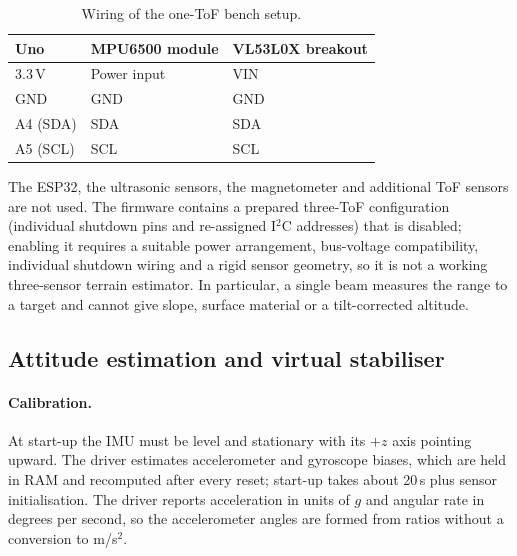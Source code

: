 \documentclass[11pt,a4paper]{article}
\begin{document}
\begin{table}[ht]
\centering
\small
\begin{tabular}{@{}l l l@{}}
\toprule
\textbf{Uno} & \textbf{MPU6500 module} & \textbf{VL53L0X breakout}\\
\midrule
3.3\,V & Power input & VIN\\
GND & GND & GND\\
A4 (SDA) & SDA & SDA\\
A5 (SCL) & SCL & SCL\\
\bottomrule
\end{tabular}
\caption{Wiring of the one-ToF bench setup.}
\label{tab:wiring}
\end{table}
 

\noindent
The ESP32, the ultrasonic sensors, the magnetometer and additional ToF sensors are not used. The firmware contains a prepared three-ToF configuration (individual shutdown pins and re-assigned I$^2$C addresses) that is disabled; enabling it requires a suitable power arrangement, bus-voltage compatibility, individual shutdown wiring and a rigid sensor geometry, so it is not a working three-sensor terrain estimator. In particular, a single beam measures the range to a target and cannot give slope, surface material or a tilt-corrected altitude.
 
\subsection{Attitude estimation and virtual stabiliser}
\paragraph{Calibration.} At start-up the IMU must be level and stationary with its $+z$ axis pointing upward. The driver estimates accelerometer and gyroscope biases, which are held in RAM and recomputed after every reset; start-up takes about 20\,s plus sensor initialisation. The driver reports acceleration in units of $g$ and angular rate in degrees per second, so the accelerometer angles are formed from ratios without a conversion to m/s$^2$.
 
\end{document}
